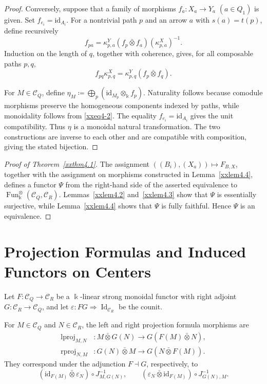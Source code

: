 \documentclass{amsart}
\newcommand{\id}{\mathrm{id}}
\DeclareMathOperator{\lproj}{lproj}
\DeclareMathOperator{\rproj}{rproj}
\newcommand{\btensor}{\mathbin{\bar{\otimes}}}
\theoremstyle{definition}
\theoremstyle{remark}
\numberwithin{equation}{section}
\begin{document}
\begin{proof}
Conversely, suppose that a family of morphisms
$f_a\colon X_a\to Y_a$ $(a\in Q_1)$ is given.
Set $f_{e_i}=\id_{A_i}$.
For a nontrivial path $p$ and an arrow $a$ with $s(a)=t(p)$, define
recursively
\[
f_{pa}
=
\kappa^Y_{p,a}
(f_p\btensor f_a)
(\kappa^X_{p,a})^{-1}.
\]
Induction on the length of $q$, together with coherence, gives, for all
composable paths $p,q$,
\begin{equation}\label{xxeq4-2}
f_{pq}\kappa^X_{p,q}
=
\kappa^Y_{p,q}
(f_p\btensor f_q).
\end{equation}

For $M\in\mathcal C_Q$, define
$\eta_M\coloneqq\bigoplus_p(\id_{M_p}\otimes_{\Bbbk} f_p)$.
Naturality follows because comodule morphisms preserve the homogeneous
components indexed by paths, while monoidality follows from
\eqref{xxeq4-2}.
The equality
$f_{e_i}=\id_{A_i}$
gives the unit compatibility.
Thus $\eta$ is a monoidal natural transformation.
The two constructions are inverse to each other and are compatible
with composition, giving the stated bijection.
\end{proof}

\begin{proof}[Proof of Theorem~\ref{xxthm4.1}]
The assignment $((B_i),(X_a))\mapsto F_{B,X}$, together with the
assignment on morphisms constructed in
Lemma~\ref{xxlem4.4}, defines a functor
$\Psi$ from the right-hand side of the asserted equivalence to
$\operatorname{Fun}^{\otimes}_{\Bbbk}(\mathcal C_Q,\mathcal C_R)$.
Lemmas~\ref{xxlem4.2}
and~\ref{xxlem4.3}
show that $\Psi$ is essentially surjective, while
Lemma~\ref{xxlem4.4}
shows that $\Psi$ is fully faithful.
Hence $\Psi$ is an equivalence.
\end{proof}


\section{Projection Formulas and Induced Functors on Centers}


Let
$F\colon\mathcal C_Q\to\mathcal C_R$
be a $\Bbbk$-linear strong monoidal functor with right adjoint
$G\colon\mathcal C_R\to\mathcal C_Q$,
and let
$\varepsilon\colon FG\Rightarrow\operatorname{Id}_{\mathcal C_R}$
be the counit.

For
$M\in\mathcal C_Q$
and
$N\in\mathcal C_R$,
the left and right projection formula morphisms are
\begin{align*}
\lproj_{M,N}&\colon
M\btensor G(N)
\longrightarrow
G(F(M)\btensor N),\\
\rproj_{N,M}&\colon
G(N)\btensor M
\longrightarrow
G(N\btensor F(M)).
\end{align*}
They correspond under the adjunction $F\dashv G$, respectively, to
\[
(\id_{F(M)}\btensor\varepsilon_N)
\circ
J_{M,G(N)}^{-1},
\qquad
(\varepsilon_N\btensor\id_{F(M)})
\circ
J_{G(N),M}^{-1}.
\]
\end{document}
